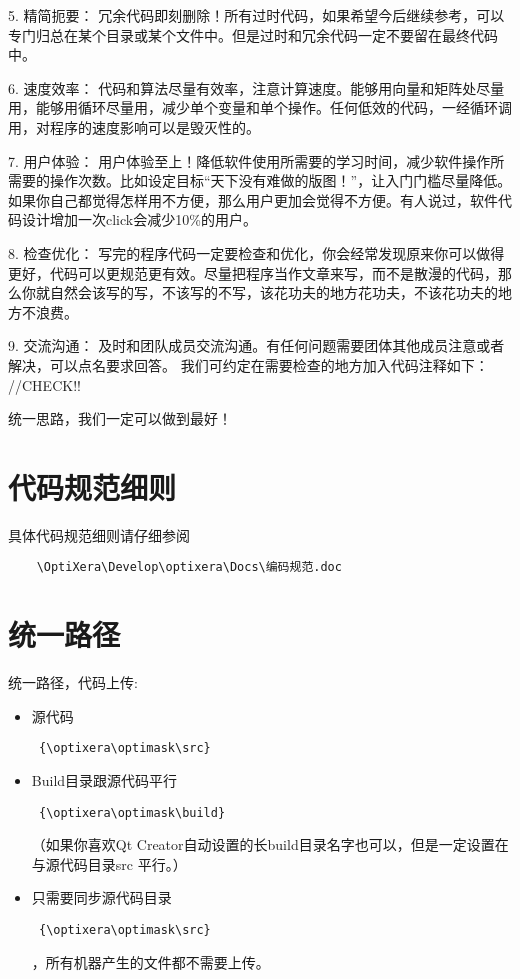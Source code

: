 5.	精简扼要：
冗余代码即刻删除！所有过时代码，如果希望今后继续参考，可以专门归总在某个目录或某个文件中。但是过时和冗余代码一定不要留在最终代码中。

6.	速度效率：
代码和算法尽量有效率，注意计算速度。能够用向量和矩阵处尽量用，能够用循环尽量用，减少单个变量和单个操作。任何低效的代码，一经循环调用，对程序的速度影响可以是毁灭性的。

7.	用户体验：
用户体验至上！降低软件使用所需要的学习时间，减少软件操作所需要的操作次数。比如设定目标“天下没有难做的版图！”，让入门门槛尽量降低。如果你自己都觉得怎样用不方便，那么用户更加会觉得不方便。有人说过，软件代码设计增加一次click会减少10\%的用户。

8.	检查优化：
写完的程序代码一定要检查和优化，你会经常发现原来你可以做得更好，代码可以更规范更有效。尽量把程序当作文章来写，而不是散漫的代码，那么你就自然会该写的写，不该写的不写，该花功夫的地方花功夫，不该花功夫的地方不浪费。

9.	交流沟通：
及时和团队成员交流沟通。有任何问题需要团体其他成员注意或者解决，可以点名要求回答。
我们可约定在需要检查的地方加入代码注释如下：        //CHECK!!

统一思路，我们一定可以做到最好！

\section{代码规范细则} \label{SectCodeRuleLiu}
具体代码规范细则请仔细参阅
{\color{red}
  \begin{verbatim}
    \OptiXera\Develop\optixera\Docs\编码规范.doc
  \end{verbatim}
}

\section{统一路径} \label{SectCodePath}
统一路径，代码上传:
\begin{itemize}
	\item 源代码 \begin{verbatim} {\optixera\optimask\src} \end{verbatim}
	\item Build目录跟源代码平行 \begin{verbatim} {\optixera\optimask\build} \end{verbatim}
	（如果你喜欢Qt Creator自动设置的长build目录名字也可以，但是一定设置在与源代码目录src 平行。）
	\item 只需要同步源代码目录\begin{verbatim} {\optixera\optimask\src} \end{verbatim}，所有机器产生的文件都不需要上传。
\end{itemize}

